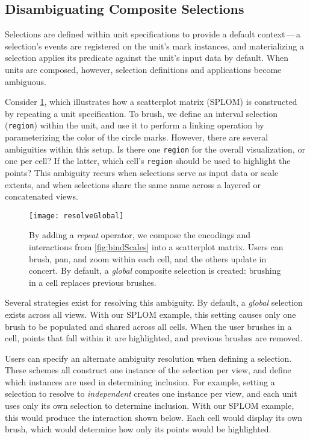\subsection{Disambiguating Composite Selections}

Selections are defined within unit specifications to provide a default
context\,---\,a selection's events are registered on the unit's mark instances,
and materializing a selection applies its predicate against the unit's input
data by default. When units are composed, however, selection definitions and
applications become ambiguous.

Consider \cref{fig:resolveGlobal}, which illustrates how a scatterplot matrix
(SPLOM) is constructed by repeating a unit specification. To brush, we define an
interval selection (\texttt{region}) within the unit, and use it to perform a
linking operation by parameterizing the color of the circle marks. However,
there are several ambiguities within this setup. Is there one \texttt{region}
for the overall visualization, or one per cell? If the latter, which cell's
\texttt{region} should be used to highlight the points?  This ambiguity recurs
when selections serve as input data or scale extents, and when selections share
the same name across a layered or concatenated views.

\begin{figure}[h!]
  \centering
  \texttt{[image: resolveGlobal]}
  \caption{By adding a \emph{repeat} operator, we compose the encodings and
  interactions from \cref{fig:bindScales} into a scatterplot matrix. Users can
  brush, pan, and zoom within each cell, and the others update in concert. By
  default, a \emph{global} composite selection is created: brushing in a cell
  replaces previous brushes.}
  \label{fig:resolveGlobal}
\end{figure}

Several strategies exist for resolving this ambiguity. By default, a
\emph{global} selection exists across all views. With our SPLOM example, this
setting causes only one brush to be populated and shared across all cells. When
the user brushes in a cell, points that fall within it are highlighted, and
previous brushes are removed.

Users can specify an alternate ambiguity resolution when defining a selection.
These schemes all construct one instance of the selection per view, and define
which instances are used in determining inclusion. For example, setting a
selection to resolve to \emph{independent} creates one instance per view, and
each unit uses only its own selection to determine inclusion. With our SPLOM
example, this would produce the interaction shown below. Each cell would display
its own brush, which would determine how only its points would be highlighted.

